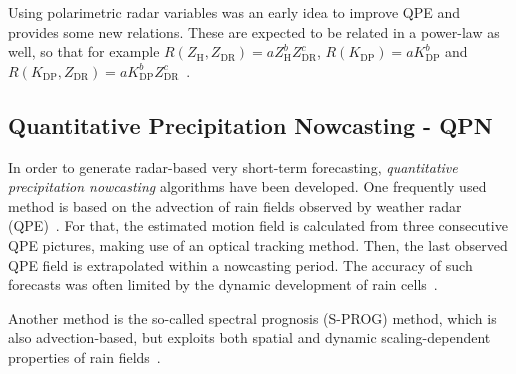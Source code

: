 Using polarimetric radar variables was an early idea to improve QPE and provides some new relations. These are expected to be related in a power-law as well, so that for example $R(Z_\text{H}, Z_\text{DR}) = a Z_\text{H}^b Z_\text{DR}^c$, $R(K_\text{DP}) = a K_\text{DP}^b$ and $R(K_\text{DP}, Z_\text{DR}) = a K_\text{DP}^b Z_\text{DR}^c$~\cite[p.~195]{zhangWeatherPola}.

\subsection{Quantitative Precipitation Nowcasting - QPN}
In order to generate radar-based very short-term forecasting, \emph{quantitative precipitation nowcasting} algorithms have been developed. One frequently used method is based on the advection of rain fields observed by weather radar (QPE)~\cite{qpn_sprog}. For that, the estimated motion field is calculated from three consecutive QPE pictures, making use of an optical tracking method. Then, the last observed QPE field is extrapolated within a nowcasting period. The accuracy of such forecasts was often limited by the dynamic development of rain cells~\cite{qpn_sprog}.

Another method is the so-called spectral prognosis (S-PROG) method, which is also advection-based, but exploits both spatial and dynamic scaling-dependent properties of rain fields~\cite{qpn_sprog}.


